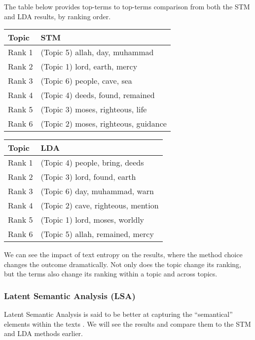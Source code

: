 \documentclass[
]{article}
\begin{document}
The table below provides top-terms to top-terms comparison from both the STM and LDA results, by ranking order.

\begin{longtable}[]{@{}ll@{}}
\toprule\noalign{}
Topic & STM \\
\midrule\noalign{}
\endhead
\bottomrule\noalign{}
\endlastfoot
Rank 1 & (Topic 5) allah, day, muhammad \\
Rank 2 & (Topic 1) lord, earth, mercy \\
Rank 3 & (Topic 6) people, cave, sea \\
Rank 4 & (Topic 4) deeds, found, remained \\
Rank 5 & (Topic 3) moses, righteous, life \\
Rank 6 & (Topic 2) moses, righteous, guidance \\
\end{longtable}

\begin{longtable}[]{@{}ll@{}}
\toprule\noalign{}
Topic & LDA \\
\midrule\noalign{}
\endhead
\bottomrule\noalign{}
\endlastfoot
Rank 1 & (Topic 4) people, bring, deeds \\
Rank 2 & (Topic 3) lord, found, earth \\
Rank 3 & (Topic 6) day, muhammad, warn \\
Rank 4 & (Topic 2) cave, righteous, mention \\
Rank 5 & (Topic 1) lord, moses, worldly \\
Rank 6 & (Topic 5) allah, remained, mercy \\
\end{longtable}

We can see the impact of text entropy on the results, where the method choice changes the outcome dramatically. Not only does the topic change its ranking, but the terms also change its ranking within a topic and across topics.

\hypertarget{latent-semantic-analysis-lsa}{%
\subsubsection{Latent Semantic Analysis (LSA)}\label{latent-semantic-analysis-lsa}}

Latent Semantic Analysis is said to be better at capturing the ``semantical'' elements within the texts \citep{landauer1998}. We will see the results and compare them to the STM and LDA methods earlier.
\end{document}
